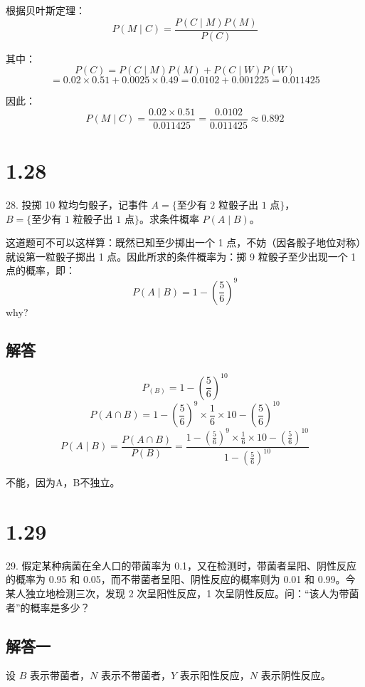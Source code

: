 \documentclass[UTF8]{report}
\theoremstyle{MyLineTheoremStyle} %
\theoremstyle{MyBlockTheoremStyle} %
\theoremstyle{MySubsubsectionStyle} %
\begin{document}
根据贝叶斯定理：
\[
P(M \mid C) = \frac{P(C \mid M)P(M)}{P(C)}
\]

其中：
\[
P(C) = P(C \mid M)P(M) + P(C \mid W)P(W)
\]
\[
= 0.02 \times 0.51 + 0.0025 \times 0.49 = 0.0102 + 0.001225 = 0.011425
\]

因此：
\[
P(M \mid C) = \frac{0.02 \times 0.51}{0.011425} = \frac{0.0102}{0.011425} \approx 0.892
\]

\section{1.28}

28. 投掷 10 粒均匀骰子，记事件 \(A = \{\text{至少有 2 粒骰子出 1 点}\}\)，\(B = \{\text{至少有 1 粒骰子出 1 点}\}\)。求条件概率 \(P(A \mid B)\)。\par
这道题可不可以这样算：既然已知至少掷出一个 1 点，不妨（因各骰子地位对称）就设第一粒骰子掷出 1 点。因此所求的条件概率为：掷 9 粒骰子至少出现一个 1 点的概率，即：
\[
P(A \mid B) = 1 - \left( \frac{5}{6} \right)^9
\]
why?
\subsection*{解答}

\[
P_(B) = 1 - \left( \frac{5}{6} \right)^{10}
\]
\[
P(A \cap B) = 1 - \left( \frac{5}{6} \right)^{9} \times \frac{1}{6} \times 10 - \left( \frac{5}{6} \right)^{10}
\]
\[
P(A \mid B) = \frac{P(A \cap B)}{P(B)} = \frac{1 - \left( \frac{5}{6} \right)^{9} \times \frac{1}{6} \times 10 - \left( \frac{5}{6} \right)^{10}}{1 - \left( \frac{5}{6} \right)^{10}}
\]\par

不能，因为A，B不独立。

\section{1.29}

29. 假定某种病菌在全人口的带菌率为 0.1，又在检测时，带菌者呈阳、阴性反应的概率为 0.95 和 0.05，而不带菌者呈阳、阴性反应的概率则为 0.01 和 0.99。今某人独立地检测三次，发现 2 次呈阳性反应，1 次呈阴性反应。问：“该人为带菌者”的概率是多少？

\subsection*{解答一}

设 \(B\) 表示带菌者，\(N\) 表示不带菌者，\(Y\) 表示阳性反应，\(N\) 表示阴性反应。
\end{document}
